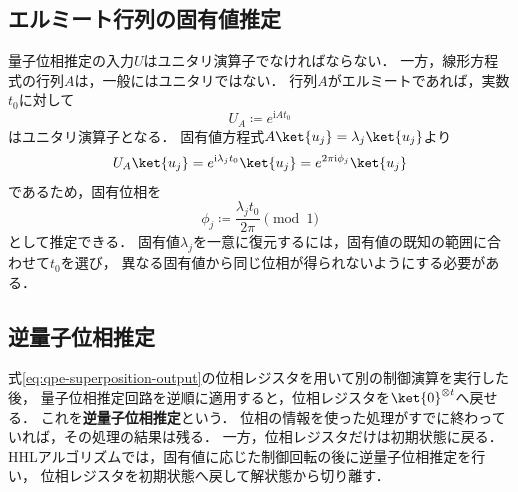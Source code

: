 \subsection{エルミート行列の固有値推定}
\label{subsec:qpe-hermitian-eigenvalues}

量子位相推定の入力$U$はユニタリ演算子でなければならない．
一方，線形方程式の行列$A$は，一般にはユニタリではない．
行列$A$がエルミートであれば，実数$t_0$に対して
\begin{equation}
  U_A
  \coloneq
  e^{\mathrm{i}At_0}
  \label{eq:qpe-hamiltonian-unitary}
\end{equation}
はユニタリ演算子となる．
固有値方程式$A\ket{u_j}=\lambda_j\ket{u_j}$より
\begin{align*}
  U_A\ket{u_j}
  =
  e^{\mathrm{i}\lambda_jt_0}\ket{u_j}
  =
  e^{2\pi\mathrm{i}\phi_j}\ket{u_j}
\end{align*}
であるため，固有位相を
\begin{equation}
  \phi_j
  \coloneq
  \frac{\lambda_jt_0}{2\pi}
  \pmod{1}
  \label{eq:eigenvalue-to-phase}
\end{equation}
として推定できる．
固有値$\lambda_j$を一意に復元するには，固有値の既知の範囲に合わせて$t_0$を選び，
異なる固有値から同じ位相が得られないようにする必要がある．

\subsection{逆量子位相推定}
\label{subsec:inverse-quantum-phase-estimation}

式\eqref{eq:qpe-superposition-output}の位相レジスタを用いて別の制御演算を実行した後，
量子位相推定回路を逆順に適用すると，位相レジスタを$\ket{0}^{\otimes t}$へ戻せる．
これを\textbf{逆量子位相推定}という．
位相の情報を使った処理がすでに終わっていれば，その処理の結果は残る．
一方，位相レジスタだけは初期状態に戻る．
HHLアルゴリズムでは，固有値に応じた制御回転の後に逆量子位相推定を行い，
位相レジスタを初期状態へ戻して解状態から切り離す．
